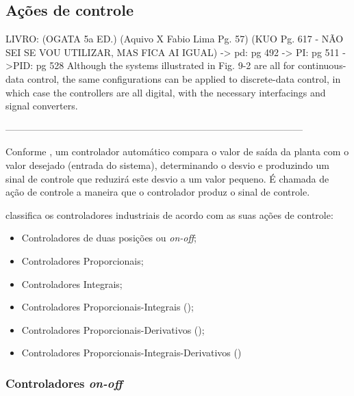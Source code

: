 






\subsection{Ações de controle}

LIVRO: (OGATA 5a ED.)
	(Aquivo X Fabio Lima Pg. 57)
	(KUO Pg. 617 - NÃO SEI SE VOU UTILIZAR, MAS FICA AI IGUAL)
	    -> pd: pg 492
	    -> PI: pg 511
	    ->PID: pg 528
Although the systems illustrated in Fig. 9-2 are all for continuous-data control, the
same configurations can be applied to discrete-data control, in which case the controllers
are all digital, with the necessary interfacings and signal converters.

---------------------------------------------------------------------------------------------
	
	
Conforme , um controlador automático compara o valor de saída da planta com o valor desejado (entrada do sistema), 
determinando o desvio e produzindo um sinal de controle que reduzirá este desvio a um valor pequeno. É chamada de ação de controle a 
maneira que o controlador produz o sinal de controle.

 classifica os controladores industriais de acordo com as suas ações de controle:
\begin{itemize}
 \item Controladores de duas posições ou \textit{on-off}; %
 \item Controladores Proporcionais;
 \item Controladores Integrais;
 \item Controladores Proporcionais-Integrais ();
 \item Controladores Proporcionais-Derivativos ();
 \item Controladores Proporcionais-Integrais-Derivativos ()
\end{itemize}

\subsubsection{Controladores \textit{on-off}}

